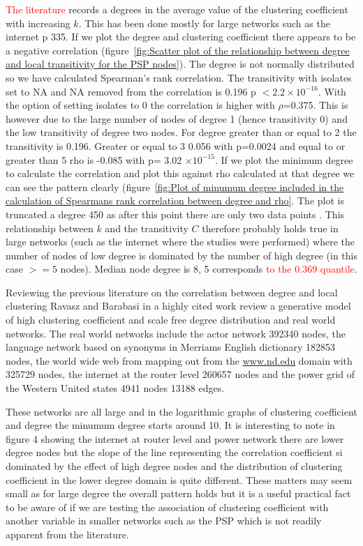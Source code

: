 \textcolor{red}{The literature} records a degrees in the average value of the clustering coefficient with increasing $k$. This has been done mostly for large networks such as the internet \cite{newman2018networks} p 335. If we plot the degree and clustering coefficient there appears to be a negative correlation (figure~\ref{fig:Scatter plot of the relationship between degree and local transitivity for the PSP nodes}). The degree is not normally distributed so we have calculated Spearman's rank correlation. The transitivity with isolates set to NA and NA removed from the correlation is 0.196 p $< 2.2 \times 10^{-16}$. With the option of setting isolates to 0 the correlation is higher with $\rho$=0.375. This is however due to the large number of nodes of degree 1 (hence transitivity 0) and the low transitivity of degree two nodes. For degree greater than or equal to 2 the transitivity is 0.196. Greater or equal to 3 0.056 with p=0.0024 and equal to or greater than 5 rho is -0.085 with p= 3.02 $\times 10^{-15}$. If we plot the minimum degree to calculate the correlation and plot
this against rho calculated at that degree we can see the pattern clearly (figure~\ref{fig:Plot of minumum degree included in the calculation of Spearmans rank correlation between degree and rho}. The plot is truncated a degree 450 as after this point there are only two data points .
This relationship between $k$ and the transitivity $C$ therefore probably holds true in large networks (such as the internet where the studies were performed) where the number of nodes of low degree is dominated by the number of high degree (in this case $>=5$ nodes). Median node degree is 8, 5 corresponds \textcolor{red}{ to the 0.369 quantile}.

Reviewing the previous literature on the correlation between degree and local clustering Ravasz and Barabasi in a highly cited work \cite{ravasz2002hierarchical} review a generative model of high clustering coefficient and scale free degree distribution and real world networks. The real world networks include the actor network 392340 nodes, the language network based on synonyms in Merriams English dictionary 182853 nodes, the world wide web from mapping out from the \url{www.nd.edu} domain with 325729 nodes, the internet at the router level 260657 nodes and the power grid of the Western United states 4941 nodes 13188 edges.

These networks are all large and in the logarithmic graphs of clustering coefficient and degree the minumum degree starts around 10. It is interesting to note in figure 4 showing the internet at router level and power network there are lower degree nodes but the slope of the line representing the correlation coefficient si dominated by the effect of high degree nodes and the distribution of clustering coefficient in the lower degree domain is quite different. These matters may seem small as for large degree the overall pattern holds but it is a useful practical fact to be aware of if we are testing the association of clustering coefficient with another variable in smaller networks such as the PSP which is not readily apparent from the literature.

